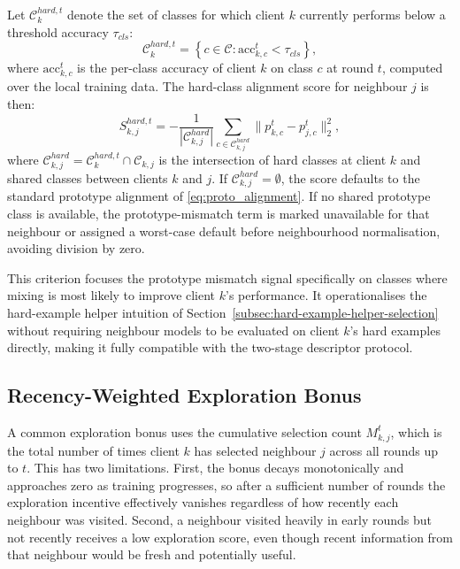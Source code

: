\documentclass[conference]{IEEEtran}
\newcommand{\rev}[1]{{\color{red}#1}}
\begin{document}
Let \(\mathcal{C}_k^{hard,t}\) denote the set of classes for which client \(k\) currently performs below a threshold accuracy \(\tau_{cls}\):
\begin{equation}
    \mathcal{C}_k^{hard,t}
    =
    \left\{
    c \in \mathcal{C} :
    \mathrm{acc}_{k,c}^t < \tau_{cls}
    \right\},
    \label{eq:hard_classes}
\end{equation}
where \(\mathrm{acc}_{k,c}^t\) is the per-class accuracy of client \(k\) on class \(c\) at round \(t\), computed over the local training data. The hard-class alignment score for neighbour \(j\) is then:
\begin{equation}
    S_{k,j}^{hard,t}
    =
    -\frac{1}{|\mathcal{C}_{k,j}^{hard}|}
    \sum_{c \in \mathcal{C}_{k,j}^{hard}}
    \|p_{k,c}^t - p_{j,c}^t\|_2^2,
    \label{eq:hard_class_alignment}
\end{equation}
where \(\mathcal{C}_{k,j}^{hard} = \mathcal{C}_k^{hard,t} \cap \mathcal{C}_{k,j}\) is the intersection of hard classes at client \(k\) and shared classes between clients \(k\) and \(j\). If \(\mathcal{C}_{k,j}^{hard} = \emptyset\), the score defaults to the standard prototype alignment of \eqref{eq:proto_alignment}. \rev{If no shared prototype class is available, the prototype-mismatch term is marked unavailable for that neighbour or assigned a worst-case default before neighbourhood normalisation, avoiding division by zero.}

This criterion focuses the prototype mismatch signal specifically on classes where mixing is most likely to improve client \(k\)'s performance. It operationalises the hard-example helper intuition of Section~\ref{subsec:hard-example-helper-selection} without requiring neighbour models to be evaluated on client \(k\)'s hard examples directly, making it fully compatible with the two-stage descriptor protocol.

\subsection{Recency-Weighted Exploration Bonus}
\label{subsec:recency-weighted-exploration}
A common exploration bonus uses the cumulative selection count \(M_{k,j}^t\), which is the total number of times client \(k\) has selected neighbour \(j\) across all rounds up to \(t\). This has two limitations. First, the bonus decays monotonically and approaches zero as training progresses, so after a sufficient number of rounds the exploration incentive effectively vanishes regardless of how recently each neighbour was visited. Second, a neighbour visited heavily in early rounds but not recently receives a low exploration score, even though recent information from that neighbour would be fresh and potentially useful.
\end{document}

